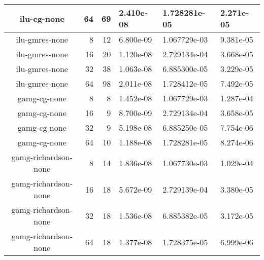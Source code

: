 \documentclass{article}\usepackage[T1]{fontenc}
\begin{document}
\begin{tabular}{crrlll}
ilu-cg-none&64&69&2.410e-08&1.728281e-05&2.271e-05\\ \hline
ilu-gmres-none&8&12&6.800e-09&1.067729e-03&9.381e-05\\
ilu-gmres-none&16&20&1.120e-08&2.729134e-04&3.668e-05\\
ilu-gmres-none&32&38&1.063e-08&6.885300e-05&3.229e-05\\
ilu-gmres-none&64&98&2.011e-08&1.728412e-05&7.492e-05\\ \hline
gamg-cg-none&8&8&1.452e-08&1.067729e-03&1.287e-04\\
gamg-cg-none&16&9&8.700e-09&2.729134e-04&3.658e-05\\
gamg-cg-none&32&9&5.198e-08&6.885250e-05&7.754e-06\\
gamg-cg-none&64&10&1.188e-08&1.728281e-05&8.274e-06\\ \hline
gamg-richardson-none&8&14&1.836e-08&1.067730e-03&1.029e-04\\
gamg-richardson-none&16&18&5.672e-09&2.729139e-04&3.380e-05\\
gamg-richardson-none&32&18&1.536e-08&6.885382e-05&3.172e-05\\
gamg-richardson-none&64&18&1.377e-08&1.728375e-05&6.999e-06\\
\hline\end{tabular}
\end{document}
